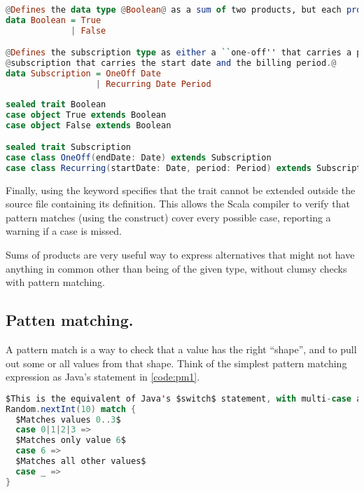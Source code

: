 \documentclass[10 pt]{article}
\begin{document}
\begin{lstlisting}[label={code:sum-haskell}, language=Haskell, escapechar=@]
@Defines the data type @Boolean@ as a sum of two products, but each product only has one value.@
data Boolean = True   
             | False

@Defines the subscription type as either a ``one-off'' that carries a particular end-date, or a recurring@
@subscription that carries the start date and the billing period.@
data Subscription = OneOff Date 
                  | Recurring Date Period
\end{lstlisting}
\begin{lstlisting}[caption={Sum types}, label={code:sum-scala}, language=Scala, escapechar=|]
sealed trait Boolean
case object True extends Boolean
case object False extends Boolean

sealed trait Subscription
case class OneOff(endDate: Date) extends Subscription
case class Recurring(startDate: Date, period: Period) extends Subscription
\end{lstlisting}

Finally, using the keyword  specifies that the trait cannot be extended outside the source file containing its definition. This allows the Scala compiler to verify that pattern matches (using the  construct) cover every possible case, reporting a warning if a case is missed.

Sums of products are very useful way to express alternatives that might not have anything in common other than being of the given type, without clumsy  checks with pattern matching.

\subsection{Patten matching.} 
A pattern match is a way to check that a value has the right ``shape'', and to pull out some or all values from that shape. Think of the simplest pattern matching expression as Java's  statement in \autoref{code:pm1}.

\begin{lstlisting}[caption={Pattern matching}, label={code:pm1}, language=Scala, escapechar=$]
$This is the equivalent of Java's $switch$ statement, with multi-case and a default case.$
Random.nextInt(10) match {
  $Matches values 0..3$
  case 0|1|2|3 =>
  $Matches only value 6$
  case 6 =>
  $Matches all other values$
  case _ =>
}
\end{lstlisting}
\end{document}
